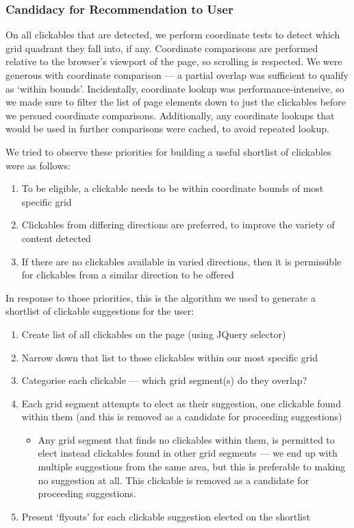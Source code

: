 \documentclass[11pt,openright,a4paper]{report}
\begin{document}
\subsubsection{Candidacy for Recommendation to User}
On all clickables that are detected, we perform coordinate tests to detect which grid quadrant they fall into, if any. Coordinate comparisons are performed relative to the browser's viewport of the page, so scrolling is respected. We were generous with coordinate comparison --- a partial overlap was sufficient to qualify as `within bounds'. Incidentally, coordinate lookup was performance-intensive, so we made sure to filter the list of page elements down to just the clickables before we persued coordinate comparisons. Additionally, any coordinate lookups that would be used in further comparisons were cached, to avoid repeated lookup.

We tried to observe these priorities for building a useful shortlist of clickables were as follows:

\begin{enumerate}
\item To be eligible, a clickable needs to be within coordinate bounds of most specific grid
\item Clickables from differing directions are preferred, to improve the variety of content detected
\item If there are no clickables available in varied directions, then it is permissible for clickables from a similar direction to be offered
\end{enumerate}

In response to those priorities, this is the algorithm we used to generate a shortlist of clickable suggestions for the user:
\begin{enumerate}
\item Create list of all clickables on the page (using JQuery selector)
\item Narrow down that list to those clickables within our most specific grid
\item Categorise each clickable --- which grid segment(s) do they overlap?
\item Each grid segment attempts to elect as their suggestion, one clickable found within them (and this is removed as a candidate for proceeding suggestions)
	\begin{itemize}
		\item Any grid segment that finds no clickables within them, is permitted to elect instead clickables found in other grid segments --- we end up with multiple suggestions from the same area, but this is preferable to making no suggestion at all. This clickable is removed as a candidate for proceeding suggestions.
	\end{itemize}
\item Present `flyouts' for each clickable suggestion elected on the shortlist
\end{enumerate}
\end{document}
